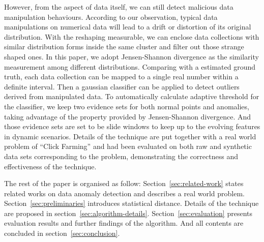 \documentclass[a4paper]{IEEEtran}
\begin{document}
		However, from the aspect of data itself, we can still detect malicious data manipulation behaviours.
		According to our observation, typical data manipulations on numerical data will lead to a drift or distortion of its original distribution. With the reshaping measurable, we can enclose data collections with similar distribution forms inside the same cluster and filter out those strange shaped ones. In this paper, we adopt Jensen-Shannon divergence as the similarity measurement among different distributions. Comparing with a estimated ground truth, each data collection can be mapped to a single real number within a definite interval. Then a gaussian classifier can be applied to detect outliers derived from manipulated data. To automatically calculate adaptive threshold for the classifier, we keep two evidence sets for both normal points and anomalies, taking advantage of the property provided by Jensen-Shannon divergence. And those evidence sets are set to be slide windows to keep up to the evolving features in dynamic scenarios.
		Details of the technique are put together with a real world problem of ``Click Farming'' and had been evaluated on both raw and synthetic data sets corresponding to the problem, demonstrating the correctness and effectiveness of the technique.
		
		The rest of the paper is organised as follow: Section~\ref{sec:related-work} states related works on data anomaly detection and describes a real world problem. Section~\ref{sec:preliminaries} introduces statistical distance. Details of the technique are proposed in section~\ref{sec:algorithm-details}. Section~\ref{sec:evaluation} presents evaluation results and further findings of the algorithm. And all contents are concluded in section~\ref{sec:conclusion}.
	
\end{document}
